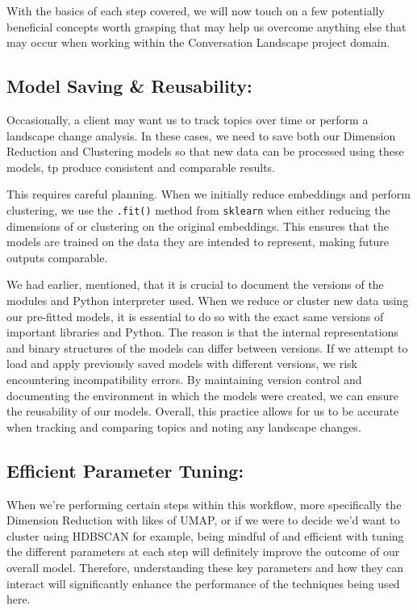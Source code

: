 \documentclass[
  letterpaper,
  DIV=11,
  numbers=noendperiod]{scrreprt}
\begin{document}
With the basics of each step covered, we will now touch on a few
potentially beneficial concepts worth grasping that may help us overcome
anything else that may occur when working within the Conversation
Landscape project domain.

\subsection{Model Saving \&
Reusability:}\label{model-saving-reusability}

Occasionally, a client may want us to track topics over time or perform
a landscape change analysis. In these cases, we need to save both our
Dimension Reduction and Clustering models so that new data can be
processed using these models, tp produce consistent and comparable
results.

This requires careful planning. When we initially reduce embeddings and
perform clustering, we use the \texttt{.fit()} method from
\texttt{sklearn} when either reducing the dimensions of or clustering on
the original embeddings. This ensures that the models are trained on the
data they are intended to represent, making future outputs comparable.

We had earlier, mentioned, that it is crucial to document the versions
of the modules and Python interpreter used. When we reduce or cluster
new data using our pre-fitted models, it is essential to do so with the
exact same versions of important libraries and Python. The reason is
that the internal representations and binary structures of the models
can differ between versions. If we attempt to load and apply previously
saved models with different versions, we risk encountering
incompatibility errors. By maintaining version control and documenting
the environment in which the models were created, we can ensure the
reusability of our models. Overall, this practice allows for us to be
accurate when tracking and comparing topics and noting any landscape
changes.

\subsection{Efficient Parameter
Tuning:}\label{efficient-parameter-tuning}

When we're performing certain steps within this workflow, more
specifically the Dimension Reduction with likes of UMAP, or if we were
to decide we'd want to cluster using HDBSCAN for example, being mindful
of and efficient with tuning the different parameters at each step will
definitely improve the outcome of our overall model. Therefore,
understanding these key parameters and how they can interact will
significantly enhance the performance of the techniques being used here.
\end{document}
